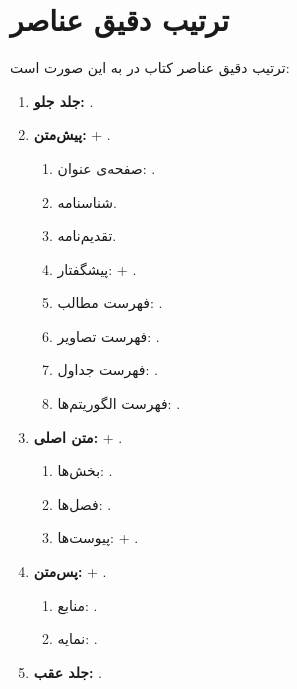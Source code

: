 \section{ترتیب دقیق عناصر}
\label{sec:book-structure-order}

ترتیب دقیق عناصر کتاب در  به
این صورت است:

\begin{enumerate}
    \item \textbf{جلد جلو:} .
    \item \textbf{پیش‌متن:}  +
    .
    \begin{enumerate}
        \item صفحه‌ی عنوان: .
        \item شناسنامه.
        \item تقدیم‌نامه.
        \item پیشگفتار:  +
        .
        \item فهرست مطالب: .
        \item فهرست تصاویر: .
        \item فهرست جداول: .
        \item فهرست الگوریتم‌ها: .
    \end{enumerate}
    \item \textbf{متن اصلی:}  +
    .
    \begin{enumerate}
        \item بخش‌ها: .
        \item فصل‌ها: .
        \item پیوست‌ها:  +
        .
    \end{enumerate}
    \item \textbf{پس‌متن:}  +
    .
    \begin{enumerate}
        \item منابع: .
        \item نمایه: .
    \end{enumerate}
    \item \textbf{جلد عقب:} .
\end{enumerate}


